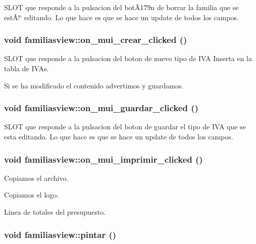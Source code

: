 SLOT que responde a la pulsacion del bot\~{A}179n de borrar la familia que se est\~{A}!` editando. Lo que hace es que se hace un update de todos los campos. 
\subsubsection{\setlength{\rightskip}{0pt plus 5cm}void familiasview::on\_\-mui\_\-crear\_\-clicked ()\hspace{0.3cm}{\tt  [virtual, slot]}}\label{classfamiliasview_i5}


SLOT que responde a la pulsacion del boton de nuevo tipo de IVA Inserta en la tabla de IVAs.

Si se ha modificado el contenido advertimos y guardamos. 
\subsubsection{\setlength{\rightskip}{0pt plus 5cm}void familiasview::on\_\-mui\_\-guardar\_\-clicked ()\hspace{0.3cm}{\tt  [virtual, slot]}}\label{classfamiliasview_i6}


SLOT que responde a la pulsacion del boton de guardar el tipo de IVA que se esta editando. Lo que hace es que se hace un update de todos los campos. 
\subsubsection{\setlength{\rightskip}{0pt plus 5cm}void familiasview::on\_\-mui\_\-imprimir\_\-clicked ()\hspace{0.3cm}{\tt  [virtual, slot]}}\label{classfamiliasview_i7}


Copiamos el archivo.

Copiamos el logo.

Linea de totales del presupuesto. 
\subsubsection{\setlength{\rightskip}{0pt plus 5cm}void familiasview::pintar ()\hspace{0.3cm}{\tt  [virtual, slot]}}\label{classfamiliasview_i8}


